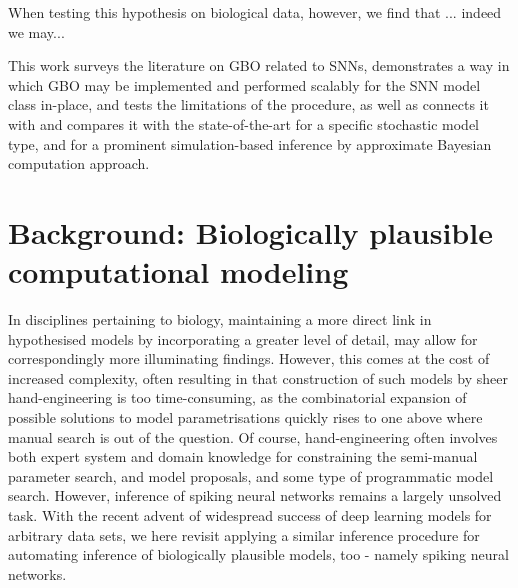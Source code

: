 \documentclass[mphil,deptreport,ianc]{infthesis} %
\begin{document}
When testing this hypothesis on biological data, however, we find that ...
indeed we may...

This work surveys the literature on GBO related to SNNs, demonstrates a way in which GBO may be implemented and performed scalably for the SNN model class in-place, and tests the limitations of the procedure, as well as connects it with and compares it with the state-of-the-art for a specific stochastic model type, and for a prominent simulation-based inference by approximate Bayesian computation approach.


\chapter{Background: Biologically plausible computational modeling}

In disciplines pertaining to biology, maintaining a more direct link in hypothesised models by incorporating a greater level of detail, may allow for correspondingly more illuminating findings.
However, this comes at the cost of increased complexity, often resulting in that construction of such models by sheer hand-engineering is too time-consuming, as the combinatorial expansion of possible solutions to model parametrisations quickly rises to one above where manual search is out of the question.
Of course, hand-engineering often involves both expert system and domain knowledge for constraining the semi-manual parameter search, and model proposals, and some type of programmatic model search.
However, inference of spiking neural networks remains a largely unsolved task.
With the recent advent of widespread success of deep learning models for arbitrary data sets, we here revisit applying a similar inference procedure for automating inference of biologically plausible models, too - namely spiking neural networks.
\end{document}
